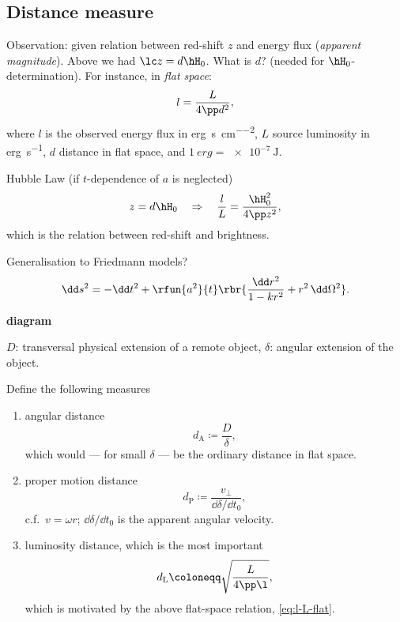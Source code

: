 \subsection{Distance measure}
Observation: given relation between red-shift $z$ and energy flux
(\emph{apparent magnitude}). Above we had $\lc z = d \hH_0$. What is $d$?
(needed for $\hH_0$-determination). For instance, in \emph{flat space}:
\begin{equation}
l = \frac{L}{4\pp d^2},
\label{eq:l-L-flat}
\end{equation}
where $l$ is the observed energy flux in
\si{erg\per\second\per\square\centi\metre}, $L$ source luminosity in
\si{erg\per\second}, $d$ distance in flat space, and $\SI{1}{erg} =
\SI{e-7}{\joule}$.

Hubble Law (if $t$-dependence of $a$ is neglected)
\begin{equation}
z = d \hH_0 \quad \Rightarrow \quad \frac{l}{L} = \frac{\hH_0^2}{4\pp z^2},
\end{equation}
which is the relation between red-shift and brightness.

Generalisation to Friedmann models?
\begin{equation}
\dd s^2 = -\dd t^2 + \rfun{a^2}{t}\rbr{\frac{\dd r^2}{1-k r^2}
+ r^2\,\dd\Omega^2}.
\end{equation}

\textbf{diagram}

$D$: transversal physical extension of a remote object, $\delta$: angular
extension of the object.

Define the following measures
\begin{enumerate}
\item angular distance
\begin{equation}
d_\text{A} \coloneqq \frac{D}{\delta},
\end{equation}
which would --- for small $\delta$ --- be the ordinary distance in flat space.
\item proper motion distance
\begin{equation}
d_\text{P} \coloneqq \frac{v_\perp}{\dd\delta/\dd t_0},
\end{equation}
c.f.\ $v = \omega r$; $\dd\delta/\dd t_0$ is the apparent angular velocity.
\item luminosity distance, which is the most important
\begin{equation}
d_\text{L} \coloneqq \sqrt{\frac{L}{4\pp\l}},
\end{equation}
which is motivated by the above flat-space relation, \cref{eq:l-L-flat}.
\end{enumerate}

